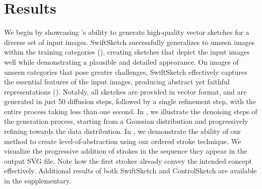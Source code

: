 





\section{Results}
We begin by showcasing \methodname's ability to generate high-quality vector sketches for a diverse set of input images.
SwiftSketch successfully generalizes to unseen images within the training categories (), creating sketches that depict the input images well while demonstrating a plausible and detailed appearance. On images of unseen categories that pose greater challenges, SwiftSketch effectively captures the essential features of the input images, producing abstract yet faithful representations (). Notably, all sketches are provided in vector format, and are generated in just 50 diffusion steps, followed by a single refinement step, with the entire process taking less than one second.
In , we illustrate the denoising steps of the generation process, starting from a Gaussian distribution and progressively refining towards the data distribution. 
In , we demonstrate the ability of our method to create level-of-abstraction using our ordered stroke technique. We visualize the progressive addition of strokes in the sequence they appear in the output SVG file. Note how the first strokes already convey the intended concept effectively. Additional results of both SwiftSketch and ControlSketch are available in the supplementary.





